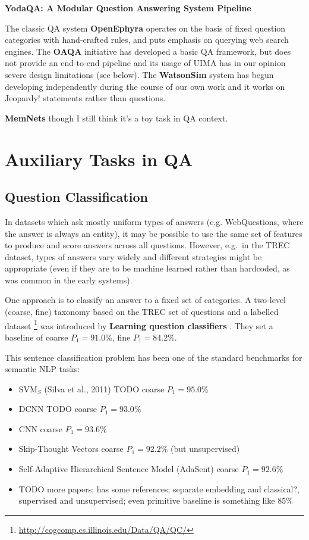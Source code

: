 \textbf{YodaQA: A Modular Question Answering System Pipeline} \citep{YodaQAPoster2015}

The classic QA system \textbf{OpenEphyra} \citep{Ephyra2006}
operates on the basis of fixed question categories with hand-crafted rules,
and puts emphasis on querying web search engines.
The \textbf{OAQA} initiative \citep{OAQATowards} has developed a basic QA framework,
but does not provide an end-to-end pipeline and its usage of UIMA has
in our opinion severe design limitations (see below).
The \textbf{WatsonSim} system \citep{WatsonSim} has begun developing independently
during the course of our own work and it works on Jeopardy! statements rather
than questions.

\textbf{MemNets} though I still think it's a toy task in QA context.

\section{Auxiliary Tasks in QA}

\subsection{Question Classification}

In datasets which ask mostly uniform types of answers (e.g. WebQuestions,
where the answer is always an entity), it may be possible to use the same
set of features to produce and score answers across all questions.
However, e.g.\ in the TREC dataset, types of answers vary widely and
different strategies might be appropriate (even if they are to be machine
learned rather than hardcoded, as was common in the early systems).

One approach is to classify an answer to a fixed set of categories.
A two-level (coarse, fine) taxonomy based on the TREC set of questions and a labelled dataset%
\footnote{\url{http://cogcomp.cs.illinois.edu/Data/QA/QC/}}
was introduced by \textbf{Learning question classifiers} \citep{QCLearning}.
They set a baseline of coarse $P_1=91.0\%$, fine $P_1=84.2\%$.

This sentence classification problem has been one of the standard benchmarks
for semantic NLP tasks:
\begin{itemize}
	\item SVM$_S$ (Silva et al., 2011) TODO coarse $P_1=95.0\%$
	\item DCNN \citep{QtcDCNN} TODO coarse $P_1=93.0\%$
	\item CNN \citep{CNNSentClass} coarse $P_1=93.6\%$
	\item Skip-Thought Vectors \citep{SkipThought} coarse $P_1=92.2\%$ (but unsupervised)
	\item Self-Adaptive Hierarchical Sentence Model \citep{AdaSent} (AdaSent) coarse $P_1=92.6\%$
	\item TODO more papers; \citep{AdaSent} has some references; separate embedding and classical?, supervised and unsupervised; even primitive baseline is something like $85\%$
\end{itemize}


